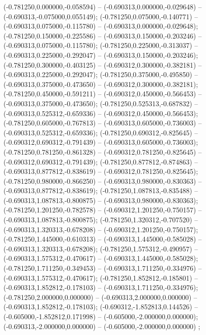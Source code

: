  (-0.781250,0.000000,-0.058594) -- (-0.690313,0.000000,-0.029648) -- (-0.690313,-0.075000,0.055149);
 (-0.781250,0.075000,-0.140771) -- (-0.690313,0.075000,-0.115780) -- (-0.690313,0.000000,-0.029648);
 (-0.781250,0.150000,-0.225586) -- (-0.690313,0.150000,-0.203246) -- (-0.690313,0.075000,-0.115780);
 (-0.781250,0.225000,-0.313037) -- (-0.690313,0.225000,-0.292047) -- (-0.690313,0.150000,-0.203246);
 (-0.781250,0.300000,-0.403125) -- (-0.690312,0.300000,-0.382181) -- (-0.690313,0.225000,-0.292047);
 (-0.781250,0.375000,-0.495850) -- (-0.690313,0.375000,-0.473650) -- (-0.690312,0.300000,-0.382181);
 (-0.781250,0.450000,-0.591211) -- (-0.690312,0.450000,-0.566453) -- (-0.690313,0.375000,-0.473650);
 (-0.781250,0.525313,-0.687832) -- (-0.690313,0.525312,-0.659336) -- (-0.690312,0.450000,-0.566453);
 (-0.781250,0.605000,-0.767813) -- (-0.690313,0.605000,-0.736003) -- (-0.690313,0.525312,-0.659336);
 (-0.781250,0.690312,-0.825645) -- (-0.690312,0.690312,-0.791439) -- (-0.690313,0.605000,-0.736003);
 (-0.781250,0.781250,-0.861328) -- (-0.690312,0.781250,-0.825645) -- (-0.690312,0.690312,-0.791439);
 (-0.781250,0.877812,-0.874863) -- (-0.690313,0.877812,-0.838619) -- (-0.690312,0.781250,-0.825645);
 (-0.781250,0.980000,-0.866250) -- (-0.690313,0.980000,-0.830363) -- (-0.690313,0.877812,-0.838619);
 (-0.781250,1.087813,-0.835488) -- (-0.690313,1.087813,-0.800875) -- (-0.690313,0.980000,-0.830363);
 (-0.781250,1.201250,-0.782578) -- (-0.690312,1.201250,-0.750157) -- (-0.690313,1.087813,-0.800875);
 (-0.781250,1.320312,-0.707520) -- (-0.690313,1.320313,-0.678208) -- (-0.690312,1.201250,-0.750157);
 (-0.781250,1.445000,-0.610313) -- (-0.690313,1.445000,-0.585028) -- (-0.690313,1.320313,-0.678208);
 (-0.781250,1.575312,-0.490957) -- (-0.690313,1.575312,-0.470617) -- (-0.690313,1.445000,-0.585028);
 (-0.781250,1.711250,-0.349453) -- (-0.690313,1.711250,-0.334976) -- (-0.690313,1.575312,-0.470617);
 (-0.781250,1.852812,-0.185801) -- (-0.690313,1.852812,-0.178103) -- (-0.690313,1.711250,-0.334976);
 (-0.781250,2.000000,0.000000) -- (-0.690313,2.000000,0.000000) -- (-0.690313,1.852812,-0.178103);
 (-0.690312,-1.852813,0.144526) -- (-0.605000,-1.852812,0.171998) -- (-0.605000,-2.000000,0.000000);
 (-0.690313,-2.000000,0.000000) -- (-0.605000,-2.000000,0.000000) ;

